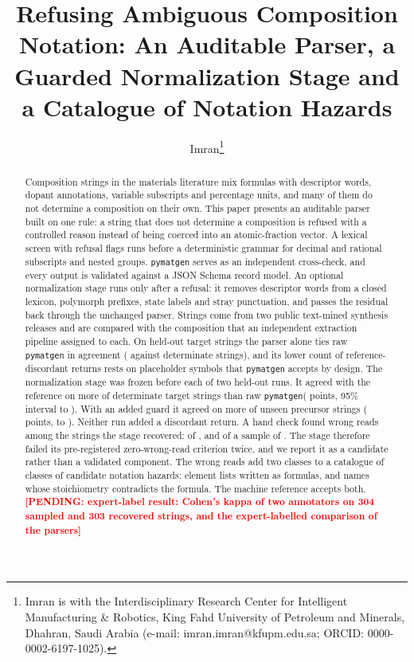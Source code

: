 \documentclass[10pt,journal]{IEEEtran}
\title{Refusing Ambiguous Composition Notation: An Auditable Parser, a Guarded Normalization Stage and a Catalogue of Notation Hazards}
\author{Imran\thanks{Imran is with the Interdisciplinary Research Center for Intelligent Manufacturing \& Robotics, King Fahd University of Petroleum and Minerals, Dhahran, Saudi Arabia (e-mail: imran.imran@kfupm.edu.sa; ORCID: \mbox{0000-0002-6197-1025}).}}
\newcommand{\PENDING}[1]{\textcolor{red}{\textbf{[PENDING: #1]}}}
\newcommand{\pmg}{\texttt{pymatgen}\xspace}
\begin{document}
\maketitle

\begin{abstract}
Composition strings in the materials literature mix formulas with descriptor words, dopant annotations, variable subscripts and percentage units, and many of them do not determine a composition on their own. This paper presents an auditable parser built on one rule: a string that does not determine a composition is refused with a controlled reason instead of being coerced into an atomic-fraction vector. A lexical screen with \NFlags{} refusal flags runs before a deterministic grammar for decimal and rational subscripts and nested groups. \pmg serves as an independent cross-check, and every output is validated against a JSON Schema record model. An optional normalization stage runs only after a refusal: it removes descriptor words from a closed lexicon, polymorph prefixes, state labels and stray punctuation, and passes the residual back through the unchanged parser. Strings come from two public text-mined synthesis releases and are compared with the composition that an independent extraction pipeline assigned to each. On \NHoStrings{} held-out target strings the parser alone ties raw \pmg in agreement (\HoAgreeVtwo{} against \HoAgreePmg{} determinate strings), and its lower count of reference-discordant returns rests on placeholder symbols that \pmg accepts by design. The normalization stage was frozen before each of two held-out runs. It agreed with the reference on \StOneGainPmg{} more of \StOneDet{} determinate target strings than raw \pmg (\StOneDiffPmg{} points, 95\% interval \StOneLoPmg{} to \StOneHiPmg). With an added guard it agreed on \StTwoGainPmg{} more of \StTwoDet{} unseen precursor strings (\StTwoDiffPmg{} points, \StTwoLoPmg{} to \StTwoHiPmg). Neither run added a discordant return. A hand check found wrong reads among the strings the stage recovered: \StOneWrong{} of \StOneRescued{}, and \StTwoWrong{} of a sample of \StTwoSample. The stage therefore failed its pre-registered zero-wrong-read criterion twice, and we report it as a candidate rather than a validated component. The wrong reads add two classes to a catalogue of \NHazClasses{} classes of candidate notation hazards: element lists written as formulas, and names whose stoichiometry contradicts the formula. The machine reference accepts both. \PENDING{expert-label result: Cohen's kappa of two annotators on 304 sampled and 303 recovered strings, and the expert-labelled comparison of the parsers}
\end{abstract}
\end{document}
